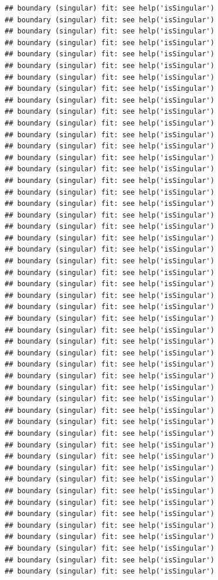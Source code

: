 \documentclass[
  12pt,
]{krantz}
\theoremstyle{definition}
\theoremstyle{definition}
\theoremstyle{definition}
\theoremstyle{definition}
\theoremstyle{remark}
\begin{document}
\begin{verbatim}
## boundary (singular) fit: see help('isSingular')
## boundary (singular) fit: see help('isSingular')
## boundary (singular) fit: see help('isSingular')
## boundary (singular) fit: see help('isSingular')
## boundary (singular) fit: see help('isSingular')
## boundary (singular) fit: see help('isSingular')
## boundary (singular) fit: see help('isSingular')
## boundary (singular) fit: see help('isSingular')
## boundary (singular) fit: see help('isSingular')
## boundary (singular) fit: see help('isSingular')
## boundary (singular) fit: see help('isSingular')
## boundary (singular) fit: see help('isSingular')
## boundary (singular) fit: see help('isSingular')
## boundary (singular) fit: see help('isSingular')
## boundary (singular) fit: see help('isSingular')
## boundary (singular) fit: see help('isSingular')
## boundary (singular) fit: see help('isSingular')
## boundary (singular) fit: see help('isSingular')
## boundary (singular) fit: see help('isSingular')
## boundary (singular) fit: see help('isSingular')
## boundary (singular) fit: see help('isSingular')
## boundary (singular) fit: see help('isSingular')
## boundary (singular) fit: see help('isSingular')
## boundary (singular) fit: see help('isSingular')
## boundary (singular) fit: see help('isSingular')
## boundary (singular) fit: see help('isSingular')
## boundary (singular) fit: see help('isSingular')
## boundary (singular) fit: see help('isSingular')
## boundary (singular) fit: see help('isSingular')
## boundary (singular) fit: see help('isSingular')
## boundary (singular) fit: see help('isSingular')
## boundary (singular) fit: see help('isSingular')
## boundary (singular) fit: see help('isSingular')
## boundary (singular) fit: see help('isSingular')
## boundary (singular) fit: see help('isSingular')
## boundary (singular) fit: see help('isSingular')
## boundary (singular) fit: see help('isSingular')
## boundary (singular) fit: see help('isSingular')
## boundary (singular) fit: see help('isSingular')
## boundary (singular) fit: see help('isSingular')
## boundary (singular) fit: see help('isSingular')
## boundary (singular) fit: see help('isSingular')
## boundary (singular) fit: see help('isSingular')
## boundary (singular) fit: see help('isSingular')
## boundary (singular) fit: see help('isSingular')
## boundary (singular) fit: see help('isSingular')
## boundary (singular) fit: see help('isSingular')
## boundary (singular) fit: see help('isSingular')
## boundary (singular) fit: see help('isSingular')
## boundary (singular) fit: see help('isSingular')

\end{verbatim}
\end{document}
